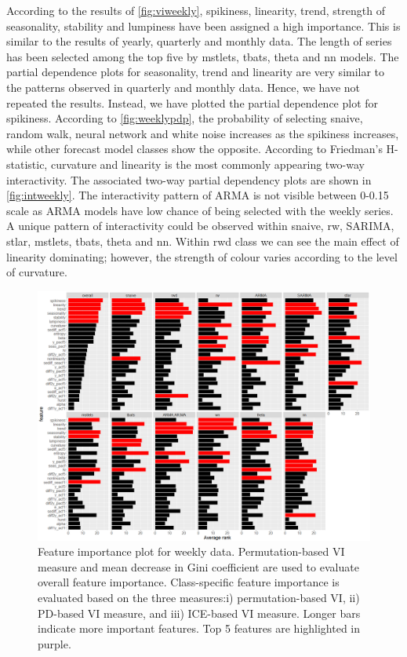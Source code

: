 \documentclass[11pt,a4paper,]{article}
\begin{document}
According to the results of \autoref{fig:viweekly}, spikiness, linearity, trend, strength of seasonality, stability and lumpiness have been assigned a high importance. This is similar to the results of yearly, quarterly and monthly data. The length of series has been selected among the top five by mstlets, tbats, theta and nn models. The partial dependence plots for seasonality, trend and linearity are very similar to the patterns observed in quarterly and monthly data. Hence, we have not repeated the results. Instead, we have plotted the partial dependence plot for spikiness. According to \autoref{fig:weeklypdp}, the probability of selecting snaive, random walk, neural network and white noise increases as the spikiness increases, while other forecast model classes show the opposite. According to Friedman's H-statistic, curvature and linearity is the most commonly appearing two-way interactivity. The associated two-way partial dependency plots are shown in \autoref{fig:intweekly}. The interactivity pattern of ARMA is not visible between 0-0.15 scale as ARMA models have low chance of being selected with the weekly series. A unique pattern of interactivity could be observed within snaive, rw, SARIMA, stlar, mstlets, tbats, theta and nn. Within rwd class we can see the main effect of linearity dominating; however, the strength of colour varies according to the level of curvature.

\begin{figure}[h]

{\centering \includegraphics{figures/viweekly-1} 

}

\caption{Feature importance plot for weekly data. Permutation-based VI measure and mean decrease in Gini coefficient are used to evaluate overall feature importance. Class-specific feature importance is evaluated based on the three measures:i) permutation-based VI, ii) PD-based VI measure, and iii) ICE-based VI measure. Longer bars indicate more important features. Top 5 features are highlighted in purple.}\label{fig:viweekly}
\end{figure}
\end{document}
